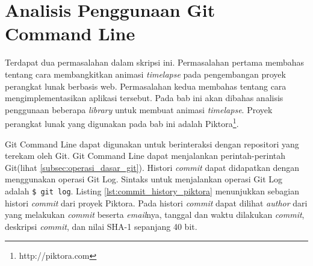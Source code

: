  \section{Analisis Penggunaan Git Command Line}
\label{sec:analisis_git}

Terdapat dua permasalahan dalam skripsi ini. Permasalahan pertama membahas tentang cara membangkitkan animasi \textit{timelapse} pada pengembangan proyek perangkat lunak berbasis web. Permasalahan kedua membahas tentang cara mengimplementasikan aplikasi tersebut. Pada bab ini akan dibahas analisis penggunaan beberapa \textit{library} untuk membuat animasi \textit{timelapse}. Proyek perangkat lunak yang digunakan pada bab ini adalah Piktora\footnote{http://piktora.com}. 

Git Command Line dapat digunakan untuk berinteraksi dengan repositori yang terekam oleh Git. Git Command Line dapat menjalankan perintah-perintah Git(lihat \ref{subsec:operasi_dasar_git}). Histori \textit{commit} dapat didapatkan dengan menggunakan operasi Git Log. Sintaks untuk menjalankan operasi Git Log adalah \texttt{\$ git log}. Listing \ref{lst:commit_history_piktora} menunjukkan sebagian histori \textit{commit} dari proyek Piktora. Pada histori \textit{commit} dapat dilihat \textit{author} dari yang melakukan \textit{commit} beserta \textit{email}nya, tanggal dan waktu dilakukan \textit{commit}, deskripsi \textit{commit}, dan nilai SHA-1 sepanjang 40 bit. 


